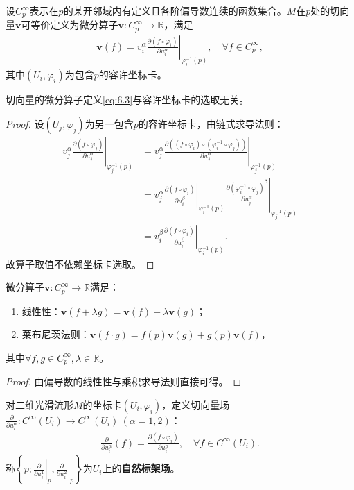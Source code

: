 \documentclass[../../main.tex]{subfiles}%
\begin{document}
\begin{definition}
设$C_p^\infty$表示在$p$的某开邻域内有定义且各阶偏导数连续的函数集合。$M$在$p$处的切向量$\bm{v}$可等价定义为微分算子$\bm{v}:C_p^\infty\to\mathbb{R}$，满足
\begin{align}
\bm{v}(f)=v_i^\alpha\left.\frac{\partial(f\circ\varphi_i)}{\partial u_i^\alpha}\right|_{\varphi_i^{-1}(p)},\quad \forall f\in C_p^\infty,\label{eq:6.3}
\end{align}
其中$(U_i,\varphi_i)$为包含$p$的容许坐标卡。
\end{definition}

\begin{proposition}
切向量的微分算子定义\eqref{eq:6.3}与容许坐标卡的选取无关。
\end{proposition}

\begin{proof}
设$(U_j,\varphi_j)$为另一包含$p$的容许坐标卡，由链式求导法则：
\begin{align*}
v_j^\alpha\left.\frac{\partial(f\circ\varphi_j)}{\partial u_j^\alpha}\right|_{\varphi_j^{-1}(p)}
&=v_j^\alpha\left.\frac{\partial\left((f\circ\varphi_i)\circ(\varphi_i^{-1}\circ\varphi_j)\right)}{\partial u_j^\alpha}\right|_{\varphi_j^{-1}(p)}\\
&=v_j^\alpha\left.\frac{\partial(f\circ\varphi_i)}{\partial u_i^\beta}\right|_{\varphi_i^{-1}(p)}\left.\frac{\partial(\varphi_i^{-1}\circ\varphi_j)^\beta}{\partial u_j^\alpha}\right|_{\varphi_j^{-1}(p)}\\
&=v_i^\beta\left.\frac{\partial(f\circ\varphi_i)}{\partial u_i^\beta}\right|_{\varphi_i^{-1}(p)}.
\end{align*}
故算子取值不依赖坐标卡选取。
\end{proof}

\begin{proposition}
微分算子$\bm{v}:C_p^\infty\to\mathbb{R}$满足：
\begin{enumerate}[(1)]
\item 线性性：$\bm{v}(f+\lambda g)=\bm{v}(f)+\lambda\bm{v}(g)$；
\item 莱布尼茨法则：$\bm{v}(f\cdot g)=f(p)\bm{v}(g)+g(p)\bm{v}(f)$，
\end{enumerate}
其中$\forall f,g\in C_p^\infty,\lambda\in\mathbb{R}$。
\end{proposition}

\begin{proof}
由偏导数的线性性与乘积求导法则直接可得。
\end{proof}

\begin{definition}
对二维光滑流形$M$的坐标卡$(U_i,\varphi_i)$，定义切向量场$\frac{\partial}{\partial u_i^\alpha}:C^\infty(U_i)\to C^\infty(U_i)\ (\alpha=1,2)$：
\begin{align}
\frac{\partial}{\partial u_i^\alpha}(f)=\frac{\partial(f\circ\varphi_i)}{\partial u_i^\alpha},\quad \forall f\in C^\infty(U_i).\label{eq:6.4}
\end{align}
称$\left\{p;\left.\frac{\partial}{\partial u_i^1}\right|_p,\left.\frac{\partial}{\partial u_i^2}\right|_p\right\}$为$U_i$上的\textbf{自然标架场}。
\end{definition}
\end{document}
